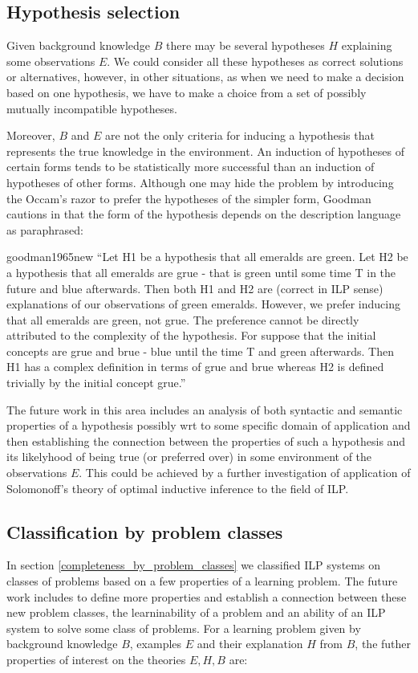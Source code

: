 \subsection{Hypothesis selection}
Given background knowledge $B$ there may be several hypotheses $H$ explaining some observations $E$. We could consider all these hypotheses as correct solutions or alternatives, however, in other situations, as when we need to make a decision based on one hypothesis, we have to make a choice from a set of possibly mutually incompatible hypotheses.

Moreover, $B$ and $E$ are not the only criteria for inducing a hypothesis that represents the true knowledge in the environment.
An induction of hypotheses of certain forms tends to be statistically more successful than an induction of hypotheses of other forms.
Although one may hide the problem by introducing the Occam's razor to prefer the hypotheses of the simpler form, Goodman cautions in \cite{goodman1965new} that the form of the hypothesis depends on the description language as paraphrased:

\begin{cite}{goodman1965new}
``Let H1 be a hypothesis that all emeralds are green. Let H2 be a hypothesis that all emeralds are grue - that is green until some time T in the future and blue afterwards. Then both H1 and H2 are (correct in ILP sense) explanations of our observations of green emeralds. However, we prefer inducing that all emeralds are green, not grue. The preference cannot be directly attributed to the complexity of the hypothesis. For suppose that the initial concepts are grue and brue - blue until the time T and green afterwards. Then H1 has a complex definition in terms of grue and brue whereas H2 is defined trivially by the initial concept grue.''
\end{cite}

The future work in this area includes an analysis of both syntactic and semantic properties of a hypothesis possibly wrt to some specific domain of application and then establishing the connection between the properties of such a hypothesis and its likelyhood of being true (or preferred over) in some environment of the observations $E$. This could be achieved by a further investigation of application of Solomonoff's theory of optimal inductive inference\cite{solomonoff1964formal}\cite{legg1997solomonoff}
 to the field of ILP.

\subsection{Classification by problem classes}
In section \ref{completeness_by_problem_classes} we classified ILP systems on classes of problems based on a few properties of a learning problem. The future work includes to define more properties and establish a connection between these new problem classes, the learninability of a problem and an ability of an ILP system to solve some class of problems. For a learning problem given by background knowledge $B$, examples $E$ and their explanation $H$ from $B$, the futher properties of interest on the theories $E, H, B$ are:


